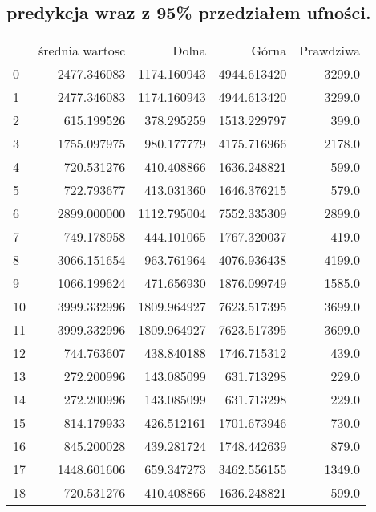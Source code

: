 \documentclass[11pt,a4paper]{article}
\begin{document}
		
		
	
	\subsection{predykcja wraz z 95\% przedziałem ufności.}
	\begin{tabular}{lrrrr}
	
		{} &  średnia wartosc &        Dolna &         Górna &  Prawdziwa \\
		 
		0  &      2477.346083 &  1174.160943 &   4944.613420 &     3299.0 \\
		1  &      2477.346083 &  1174.160943 &   4944.613420 &     3299.0 \\
		2  &       615.199526 &   378.295259 &   1513.229797 &      399.0 \\
		3  &      1755.097975 &   980.177779 &   4175.716966 &     2178.0 \\
		4  &       720.531276 &   410.408866 &   1636.248821 &      599.0 \\
		5  &       722.793677 &   413.031360 &   1646.376215 &      579.0 \\
		6  &      2899.000000 &  1112.795004 &   7552.335309 &     2899.0 \\
		7  &       749.178958 &   444.101065 &   1767.320037 &      419.0 \\
		8  &      3066.151654 &   963.761964 &   4076.936438 &     4199.0 \\
		9  &      1066.199624 &   471.656930 &   1876.099749 &     1585.0 \\
		10 &      3999.332996 &  1809.964927 &   7623.517395 &     3699.0 \\
		11 &      3999.332996 &  1809.964927 &   7623.517395 &     3699.0 \\
		12 &       744.763607 &   438.840188 &   1746.715312 &      439.0 \\
		13 &       272.200996 &   143.085099 &    631.713298 &      229.0 \\
		14 &       272.200996 &   143.085099 &    631.713298 &      229.0 \\
		15 &       814.179933 &   426.512161 &   1701.673946 &      730.0 \\
		16 &       845.200028 &   439.281724 &   1748.442639 &      879.0 \\
		17 &      1448.601606 &   659.347273 &   3462.556155 &     1349.0 \\
		18 &       720.531276 &   410.408866 &   1636.248821 &      599.0 \\

\end{tabular}
\end{document}
